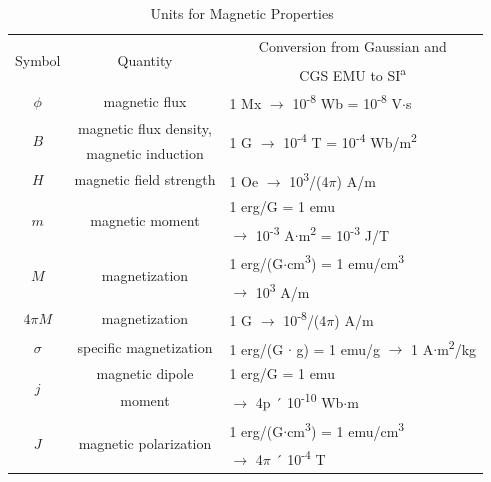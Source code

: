 \begin{table}[!bt]
	\renewcommand{\arraystretch}{1.3}
	\caption{Units for Magnetic Properties~\cite{IEEEMSW2013}}
	\label{tab:magnetic_properties_units}
	\vspace{-2ex}
	\centering
	\scriptsize
 \begin{tabular}{c|c|l}
 \hline
 \hline
 \multirow{2}[2]{*}{Symbol} & \multirow{2}[2]{*}{Quantity} & \multicolumn{1}{c}{Conversion from Gaussian and}\\ 
       &       & \multicolumn{1}{c}{CGS EMU to SI\textsuperscript{a}}\\
 \hline
 \hline
 $\phi$     & magnetic flux & 1 Mx $\rightarrow$ 10\textsuperscript{-8} Wb = 10\textsuperscript{-8} V$\cdot$s\\ \hline
 \multirow{2}[0]{*}{$B$} & magnetic flux density,  & \multirow{2}[0]{*}{1 G $\rightarrow$ 10\textsuperscript{-4} T = 10\textsuperscript{-4} Wb/m\textsuperscript{2}} \\ 
       &   magnetic induction &  \\ \hline
 $H$ & magnetic field strength & 1 Oe $\rightarrow$ 10\textsuperscript{3}/(4$\pi$) A/m \\ \hline
 \multirow{2}[0]{*}{$m$} & \multirow{2}[0]{*}{magnetic moment} & 1 erg/G = 1 emu  \\ 
       &       &   $\rightarrow$ 10\textsuperscript{-3} A$\cdot$m\textsuperscript{2} = 10\textsuperscript{-3} J/T \\ \hline
 \multirow{2}[0]{*}{$M$} & \multirow{2}[0]{*}{magnetization} & 1 erg/(G$\cdot$cm\textsuperscript{3}) = 1 emu/cm\textsuperscript{3} \\ 
       &       &   $\rightarrow$ 10\textsuperscript{3} A/m \\ \hline
 $4\pi M$   & magnetization & 1 G $\rightarrow$ 10\textsuperscript{-8}/(4$\pi$) A/m \\ \hline
 $\sigma$     & specific magnetization & 1 erg/(G $\cdot$ g) = 1 emu/g $\rightarrow$ 1 A$\cdot$m\textsuperscript{2}/kg \\ \hline
 \multirow{2}[0]{*}{$j$} & magnetic dipole  & 1 erg/G = 1 emu  \\ 
       &   moment &   $\rightarrow$ 4p ´ 10\textsuperscript{-10} Wb$\cdot$m \\ \hline
 \multirow{2}[0]{*}{$J$} & \multirow{2}[0]{*}{magnetic polarization} & 1 erg/(G$\cdot$cm\textsuperscript{3}) = 1 emu/cm\textsuperscript{3} \\ 
       &       &   $\rightarrow$ 4$\pi$ ´ 10\textsuperscript{-4} T \\ \hline

\end{tabular}
\end{table}
